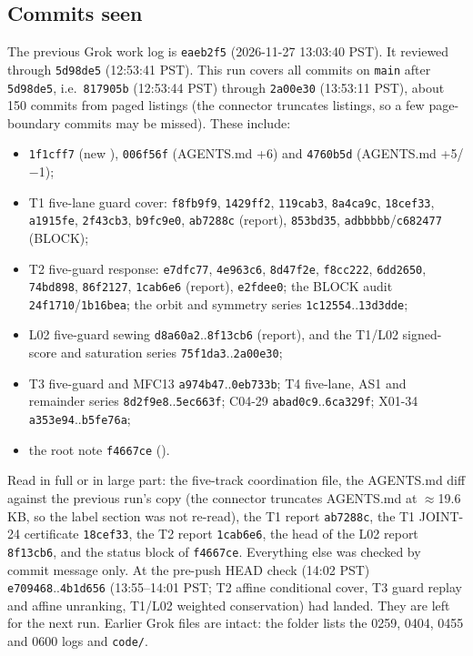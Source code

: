\documentclass[11pt]{article}
\theoremstyle{definition}
\begin{document}
\subsection*{Commits seen}
The previous Grok work log is \texttt{eaeb2f5} (2026-11-27 13:03:40 PST). It reviewed through \texttt{5d98de5} (12:53:41 PST). This run covers all commits on \texttt{main} after \texttt{5d98de5}, i.e.\ \texttt{817905b} (12:53:44 PST) through \texttt{2a00e30} (13:53:11 PST), about 150 commits from paged listings (the connector truncates listings, so a few page-boundary commits may be missed). These include:
\begin{itemize}
\item \texttt{1f1cff7} (new ), \texttt{006f56f} (AGENTS.md +6) and \texttt{4760b5d} (AGENTS.md +5/$-$1);
\item T1 five-lane guard cover: \texttt{f8fb9f9}, \texttt{1429ff2}, \texttt{119cab3}, \texttt{8a4ca9c}, \texttt{18cef33}, \texttt{a1915fe}, \texttt{2f43cb3}, \texttt{b9fc9e0}, \texttt{ab7288c} (report), \texttt{853bd35}, \texttt{adbbbbb}/\texttt{c682477} (BLOCK);
\item T2 five-guard response: \texttt{e7dfc77}, \texttt{4e963c6}, \texttt{8d47f2e}, \texttt{f8cc222}, \texttt{6dd2650}, \texttt{74bd898}, \texttt{86f2127}, \texttt{1cab6e6} (report), \texttt{e2fdee0}; the BLOCK audit \texttt{24f1710}/\texttt{1b16bea}; the orbit and symmetry series \texttt{1c12554}..\texttt{13d3dde};
\item L02 five-guard sewing \texttt{d8a60a2}..\texttt{8f13cb6} (report), and the T1/L02 signed-score and saturation series \texttt{75f1da3}..\texttt{2a00e30};
\item T3 five-guard and MFC13 \texttt{a974b47}..\texttt{0eb733b}; T4 five-lane, AS1 and remainder series \texttt{8d2f9e8}..\texttt{5ec663f}; C04-29 \texttt{abad0c9}..\texttt{6ca329f}; X01-34 \texttt{a353e94}..\texttt{b5fe76a};
\item the root note \texttt{f4667ce} ().
\end{itemize}
Read in full or in large part: the five-track coordination file, the AGENTS.md diff against the previous run's copy (the connector truncates AGENTS.md at $\approx$19.6\,KB, so the label section was not re-read), the T1 report \texttt{ab7288c}, the T1 JOINT-24 certificate \texttt{18cef33}, the T2 report \texttt{1cab6e6}, the head of the L02 report \texttt{8f13cb6}, and the status block of \texttt{f4667ce}. Everything else was checked by commit message only. At the pre-push HEAD check (14:02 PST) \texttt{e709468}..\texttt{4b1d656} (13:55--14:01 PST; T2 affine conditional cover, T3 guard replay and affine unranking, T1/L02 weighted conservation) had landed. They are left for the next run. Earlier Grok files are intact: the folder lists the 0259, 0404, 0455 and 0600 logs and \texttt{code/}.
\end{document}
